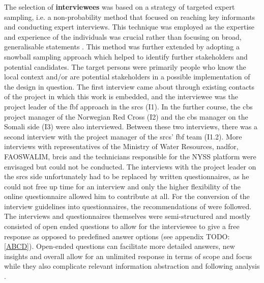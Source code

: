 The selection of \textbf{interviewees} was based on a strategy of targeted expert sampling, i.e. a non-probability method that focused on reaching key informants and conducting expert interviews. This technique was employed as the expertise and experience of the individuals was crucial rather than focusing on broad, generalisable statements \autocite{pelzResearchMethodsSocial}. This method was further extended by adopting a snowball sampling approach which helped to identify further stakeholders and potential candidates.\newline
The target persons were primarily people who know the local context and/or are potential stakeholders in a possible implementation of the design in question. The first interview came about through existing contacts of the project in which this work is embedded, and the interviewee was the project leader of the \acrshort{fbf} approach in the \acrshort{srcs} (I1). In the further course, the \acrshort{cbs} project manager of the Norwegian Red Cross (I2) and the \acrshort{cbs} manager on the Somali side (I3) were also interviewed. Between these two interviews, there was a second interview with the project manager of the \acrshort{srcs}' \acrshort{fbf} team (I1.2). More interviews with representatives of the Ministry of Water Resources, \acrshort{nadfor}, FAOSWALIM, \acrshort{brcis} and the technicians responsible for the NYSS platform were envisaged but could not be conducted. The interviews with the project leader on the \acrshort{srcs} side unfortunately had to be replaced by written questionnaires, as he could not free up time for an interview and only the higher flexibility of the online questionnaire allowed him to contribute at all. For the conversion of the interview guidelines into questionnaires, the recommendations of \autocite{harknessCCSGQuestionnaireDesign2016} were followed. The interviews and questionnaires themselves were semi-structured and mostly consisted of open ended questions to allow for the interviewee to give a free response as opposed to predefined answer options (see appendix TODO: \ref{ABCD}). Open-ended questions can facilitate more detailed answers, new insights and overall allow for an unlimited response in terms of scope and focus while they also complicate relevant information abstraction and following analysis \autocite{pelzResearchMethodsSocial}.\newline
